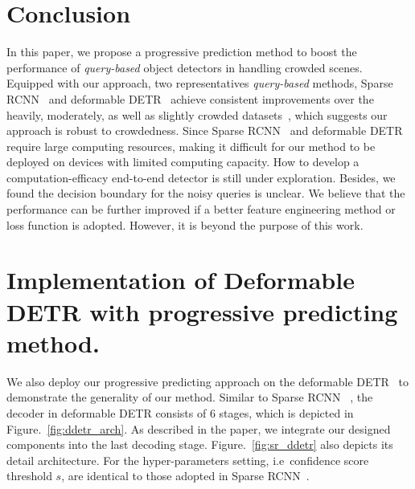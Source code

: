 \documentclass[final]{cvpr}
\begin{document}
\vspace{-0.2cm}
\section{Conclusion}
In this paper, we propose a progressive prediction method to boost the performance of \emph{query-based} object detectors in handling crowded scenes. Equipped with our approach, two representatives \textit{query-based} methods, Sparse RCNN~\cite{sun2020sparse} and deformable DETR~\cite{zhu2021deformable} achieve consistent improvements over the heavily, moderately, as well as slightly crowded datasets~\cite{shao2018crowdhuman, zhang2017citypersons, lin2014microsoft}, which suggests our approach is robust to crowdedness. Since Sparse RCNN~\cite{sun2020sparse} and deformable DETR~\cite{zhu2021deformable} require large computing resources, making it difficult for our method to be deployed on devices with limited computing capacity. How to develop a computation-efficacy end-to-end detector is still under exploration. Besides, we found the decision boundary for the noisy queries is unclear. We believe that the performance can be further improved if a better feature engineering method or loss function is adopted. However, it is beyond the purpose of this work.

\clearpage

  {\small
    
    
  }
\newpage
\appendix
\vspace{-0.4cm}
\section{Implementation of Deformable DETR with progressive predicting method.}

We also deploy our progressive predicting approach on the deformable DETR~\cite{zhu2021deformable} to demonstrate the generality of our method. Similar to Sparse RCNN ~\cite{sun2020sparse}, the decoder in deformable DETR consists of 6 stages, which is depicted in Figure.~\ref{fig:ddetr_arch}. As described in the paper, we integrate our designed components into the last decoding stage. Figure.~\ref{fig:sr_ddetr} also depicts its detail architecture. For the hyper-parameters setting, i.e\ confidence score threshold $s$, are identical to those adopted in Sparse RCNN~\cite{sun2020sparse}.
\end{document}
